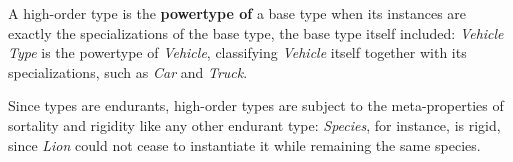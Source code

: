 A high-order type is the \textbf{powertype of} a base type when its instances are exactly the specializations of the base type, the base type itself included: \emph{Vehicle Type} is the powertype of \emph{Vehicle}, classifying \emph{Vehicle} itself together with its specializations, such as \emph{Car} and \emph{Truck}.

Since types are endurants, high-order types are subject to the meta-properties of sortality and rigidity like any other endurant type: \emph{Species}, for instance, is rigid, since \emph{Lion} could not cease to instantiate it while remaining the same species.








